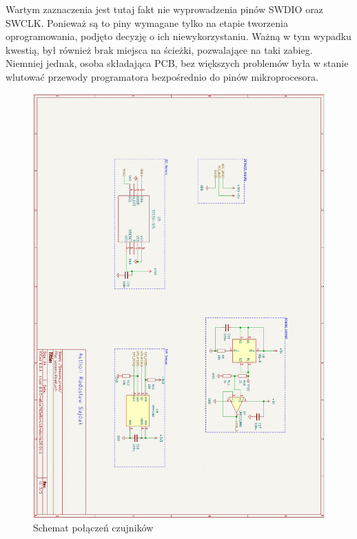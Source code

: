 \newline
Wartym zaznaczenia jest tutaj fakt nie wyprowadzenia pinów SWDIO oraz SWCLK. Ponieważ są to piny wymagane tylko na etapie tworzenia oprogramowania, podjęto decyzję o ich niewykorzystaniu. Ważną w tym wypadku kwestią, był również brak miejsca na ścieżki, pozwalające na taki zabieg. Niemniej jednak, osoba składająca PCB, bez większych problemów była w stanie wlutować przewody programatora bezpośrednio do pinów mikroprocesora.
\begin{figure}[H]
    \centering
    \includegraphics[width=\textwidth, height=\textheight, keepaspectratio]{Graphics/sensors_sch.png}
    \caption{Schemat połączeń czujników}
    \label{img:sensors_sch}
\end{figure}
